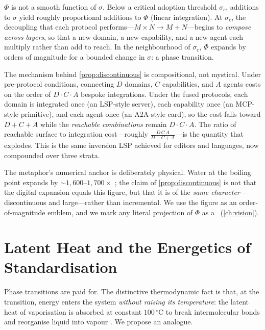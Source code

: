 \begin{proposition}
\label{prop:discontinuous}
$\Phi$ is not a smooth function of $\sigma$. Below a critical adoption threshold
$\sigma_c$, additions to $\sigma$ yield roughly proportional additions to
$\Phi$ (linear integration). At $\sigma_c$, the decoupling that each protocol
performs---$M \times N \to M + N$---begins to \emph{compose across layers}, so
that a new domain, a new capability, and a new agent each multiply rather than
add to reach. In the neighbourhood of $\sigma_c$, $\Phi$ expands by orders of
magnitude for a bounded change in $\sigma$: a phase transition.
\end{proposition}

The mechanism behind \cref{prop:discontinuous} is compositional, not mystical.
Under pre-protocol conditions, connecting $D$ domains, $C$ capabilities, and $A$
agents costs on the order of $D \cdot C \cdot A$ bespoke integrations. Under the
fused protocols, each domain is integrated once (an LSP-style server), each
capability once (an MCP-style primitive), and each agent once (an A2A-style
card), so the cost falls toward $D + C + A$ while the \emph{reachable
combinations} remain $D \cdot C \cdot A$. The ratio of reachable surface to
integration cost---roughly $\tfrac{D\,C\,A}{D+C+A}$---is the quantity that
explodes. This is the same inversion LSP achieved for editors and languages,
now compounded over three strata.

\begin{remark}
The metaphor's numerical anchor is deliberately physical. Water at the boiling
point expands by ${\sim}1{,}600$--$1{,}700\times$
\citep{phys-illinois-steam,nationalboard-steam}; the claim of
\cref{prop:discontinuous} is not that the digital expansion equals this figure,
but that it is of the \emph{same character}---discontinuous and large---rather
than incremental. We use the figure as an order-of-magnitude emblem, and we mark
any literal projection of $\Phi$ as a \forecast\ (\cref{ch:vision}).
\end{remark}

\section{Latent Heat and the Energetics of Standardisation}
\label{sec:fw-latent}

Phase transitions are paid for. The distinctive thermodynamic fact is that, at
the transition, energy enters the system \emph{without raising its
temperature}: the latent heat of vaporisation is absorbed at constant
$100\,^{\circ}\mathrm{C}$ to break intermolecular bonds and reorganise liquid
into vapour \citep{latentheat-openstax}. We propose an analogue.

